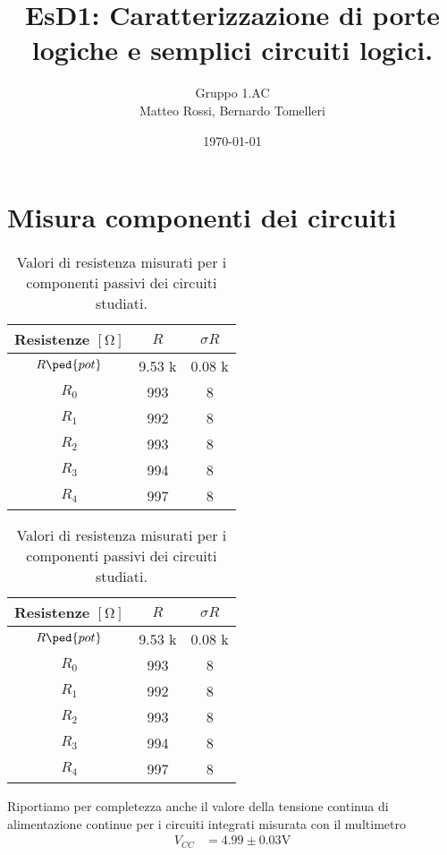 \documentclass[10pt, a4paper, italian]{article}
\author{Gruppo 1.AC \\ Matteo Rossi, Bernardo Tomelleri}
\title{EsD1: Caratterizzazione di porte logiche e semplici circuiti logici.}
\begin{document}
\date{\today}
\maketitle

\setcounter{section}{0}

\section{Misura componenti dei circuiti}
\begin{table}[htbp]
\centering
\begin{tabular}{ccc}
\toprule
Resistenze $[\si{\ohm}]$ & $R$ & $\sigma R$ \\
\midrule
\midrule
$R\ped{pot}$	& 9.53 k	& 0.08 k 		\\
$R_0$	  		& 993		& 8				\\
$R_1$	  		& 992		& 8	 			\\
$R_2$	  		& 993		& 8	 			\\
$R_3$	  		& 994		& 8	 			\\
$R_4$	  		& 997		& 8	 			\\
\bottomrule     
\end{tabular}
\caption{Valori di resistenza misurati per i componenti passivi dei circuiti
studiati. \label{tab: rmesB}}
\end{table}

\begin{table}[htbp]
\centering
\begin{tabular}{ccc}
\toprule
Resistenze $[\si{\ohm}]$ & $R$ & $\sigma R$ \\
\midrule
\midrule
$R\ped{pot}$	& 9.53 k	& 0.08 k 		\\
$R_0$	  		& 993		& 8				\\
$R_1$	  		& 992		& 8	 			\\
$R_2$	  		& 993		& 8	 			\\
$R_3$	  		& 994		& 8	 			\\
$R_4$	  		& 997		& 8	 			\\
\bottomrule     
\end{tabular}
\caption{Valori di resistenza misurati per i componenti passivi dei circuiti
studiati. \label{tab: rmesB}}
\end{table}

Riportiamo per completezza anche il valore della tensione continua di
alimentazione continue per i circuiti integrati misurata con il multimetro
\begin{align*}
V_{CC} &= 4.99 \pm 0.03 \si{\V} \\
\end{align*}
\end{document}
